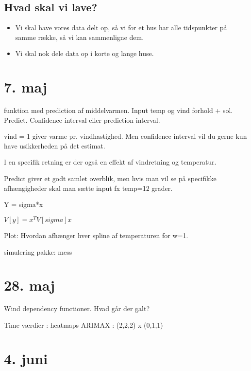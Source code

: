 \subsection{Hvad skal vi lave?}
\begin{itemize}
    \item Vi skal have vores data delt op, så vi for et hus har alle tidspunkter på samme række, så vi kan sammenligne dem.
    \item Vi skal nok dele data op i korte og lange huse.  
\end{itemize}


\section{7. maj}

funktion med prediction af middelvarmen. Input temp og vind forhold + sol.
Predict. Confidence interval eller prediction interval.

vind = 1 giver varme pr. vindhastighed. Men confidence interval vil du gerne kun have usikkerheden på det estimat.

I en specifik retning er der også en effekt af vindretning og temperatur.


Predict giver et godt samlet overblik, men hvis man vil se på specifikke afhængigheder skal man sætte input fx temp=12 grader.


Y = sigma*x

$V[y] = x^T V[sigma] x$


Plot: Hvordan afhænger hver spline af temperaturen for w=1.



simulering pakke:
mess


\section{28. maj}
Wind dependency functioner. Hvad går der galt?

Time værdier : heatmaps
ARIMAX : (2,2,2) x (0,1,1)

\pagebreak

\section{4. juni}


